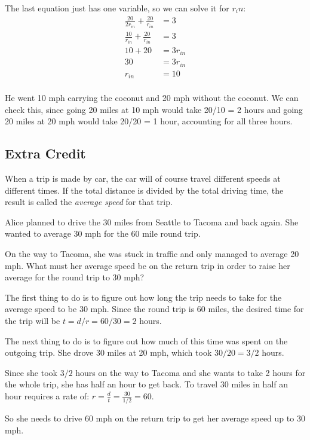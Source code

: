 \documentclass[fleqn,addpoints]{exam}
\begin{document}
\begin{questions}
\begin{solution}[5 cm]
The last equation just has one variable, so we can solve it for $r_in$:
\begin{align*}
  \frac{20}{2r_{in}} + \frac{20}{r_{in}} &= 3  \\
  \frac{10}{r_{in}} + \frac{20}{r_{in}} &= 3  \\
  10 + 20 &= 3 r_{in}  \\
  30 &= 3 r_{in}  \\
  r_{in} &= 10  \\
\end{align*}

He went 10 mph carrying the coconut and 20 mph without the coconut.  We can check this, since going 20 miles at 10 mph
would take 20/10 = 2 hours and going 20 miles at 20 mph would take 20/20 = 1 hour, accounting for all three hours.


\end{solution}

\noaddpoints

\ifprintanswers
\else
\pagebreak
\fi

\subsection{Extra Credit}

\question[10]

When a trip is made by car, the car will of course travel different speeds at different times.  If the total distance is
divided by the total driving time, the result is called the {\em average speed} for that trip.

Alice planned to drive the 30 miles from Seattle to Tacoma and back again.  She wanted to average 30 mph for the 60 mile
round trip.  

On the way to Tacoma, she was stuck in traffic and only managed to average 20 mph.  What must her average speed be on
the return trip in order to raise her average for the round trip to 30 mph?

\begin{solution}[5 cm]

The first thing to do is to figure out how long the trip needs to take for the average speed to be 30 mph.  Since the
round trip is 60 miles, the desired time for the trip will be $t=d/r = 60/30 = 2$ hours.

The next thing to do is to figure out how much of this time was spent on the outgoing trip.  She drove 30 miles at 20
mph, which took $30/20 = 3/2$ hours.

Since she took $3/2$ hours on the way to Tacoma and she wants to take 2 hours for the whole trip, she has half an hour to get
back.  To travel 30 miles in half an hour requires a rate of: $\displaystyle r = \frac{d}{t} = \frac{30}{1/2} = 60$.

So she needs to drive 60 mph on the return trip to get her average speed up to 30 mph.

\end{solution}


\end{questions}
\end{document}
